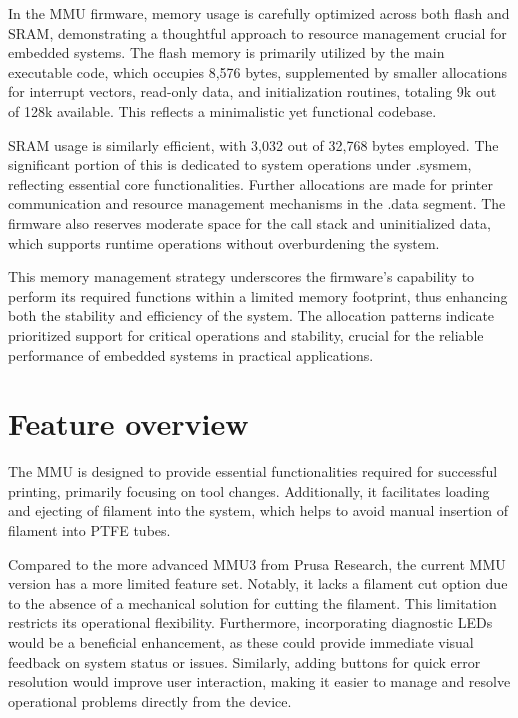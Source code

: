 In the MMU firmware, memory usage is carefully optimized across both flash and SRAM, demonstrating a thoughtful approach to resource management crucial for embedded systems. The flash memory is primarily utilized by the main executable code, which occupies 8,576 bytes, supplemented by smaller allocations for interrupt vectors, read-only data, and initialization routines, totaling 9k out of 128k available. This reflects a minimalistic yet functional codebase.

SRAM usage is similarly efficient, with 3,032 out of 32,768 bytes employed. The significant portion of this is dedicated to system operations under .sysmem, reflecting essential core functionalities. Further allocations are made for printer communication and resource management mechanisms in the .data segment. The firmware also reserves moderate space for the call stack and uninitialized data, which supports runtime operations without overburdening the system.

This memory management strategy underscores the firmware's capability to perform its required functions within a limited memory footprint, thus enhancing both the stability and efficiency of the system. The allocation patterns indicate prioritized support for critical operations and stability, crucial for the reliable performance of embedded systems in practical applications.

\section{Feature overview}

The MMU is designed to provide essential functionalities required for successful printing, primarily focusing on tool changes. Additionally, it facilitates loading and ejecting of filament into the system, which helps to avoid manual insertion of filament into PTFE tubes.

Compared to the more advanced MMU3 from Prusa Research, the current MMU version has a more limited feature set. Notably, it lacks a filament cut option due to the absence of a mechanical solution for cutting the filament. This limitation restricts its operational flexibility. Furthermore, incorporating diagnostic LEDs would be a beneficial enhancement, as these could provide immediate visual feedback on system status or issues. Similarly, adding buttons for quick error resolution would improve user interaction, making it easier to manage and resolve operational problems directly from the device.
